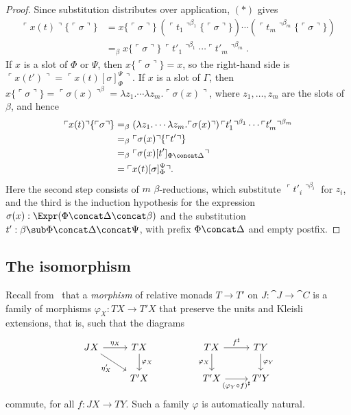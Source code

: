 \begin{proof}
    Since substitution distributes over application, $(*)$ gives
    \begin{align*}    
        \ulcorner x(t) \urcorner\{\ulcorner \sigma \urcorner\} &= x\{\ulcorner \sigma \urcorner\}\, \left(\ulcorner t_1 \urcorner^{\beta_1}\{\ulcorner \sigma \urcorner\}\right) \cdots \left(\ulcorner t_m \urcorner^{\beta_m}\{\ulcorner \sigma \urcorner\}\right)\\
        &=_\beta x\{\ulcorner \sigma \urcorner\}\, \ulcorner t'_1 \urcorner^{\beta_1} \cdots \ulcorner t'_m \urcorner^{\beta_m}.
    \end{align*}
    If $x$ is a slot of $\Phi$ or $\Psi$, then $x\{\ulcorner \sigma \urcorner\} = x$, so the right-hand side is $\ulcorner x(t') \urcorner = \ulcorner x(t)[\sigma]_\Phi^\Psi \urcorner$. If $x$ is a slot of $\Gamma$, then $x\{\ulcorner \sigma \urcorner\} = \ulcorner \sigma(x) \urcorner^\beta = \lambda z_1. \cdots \lambda z_m. \ulcorner \sigma(x) \urcorner$, where $z_1, \ldots, z_m$ are the slots of $\beta$, and hence
    \begin{align*}
        \ulcorner x(t) \urcorner\{\ulcorner \sigma \urcorner\}
        &=_\beta (\lambda z_1. \cdots \lambda z_m. \ulcorner \sigma(x) \urcorner)\, \ulcorner t'_1 \urcorner^{\beta_1} \cdots \ulcorner t'_m \urcorner^{\beta_m}\\
        &=_\beta \ulcorner \sigma(x) \urcorner\{\ulcorner t' \urcorner\}\\
        &=_\beta \ulcorner \sigma(x)[t']_{\Phi \concat \Delta} \urcorner\\
        &= \ulcorner x(t)[\sigma]_\Phi^\Psi \urcorner.
    \end{align*}
    Here the second step consists of $m$ $\beta$-reductions, which substitute $\ulcorner t'_i \urcorner^{\beta_i}$ for $z_i$, and the third is the induction hypothesis for the expression $\sigma(x) : \Expr(\Phi \concat \Delta \concat \beta)$ and the substitution $t' : \beta \sub \Phi \concat \Delta \concat \Psi$, with prefix $\Phi \concat \Delta$ and empty postfix.
\end{proof}

\subsection{The isomorphism}

Recall from~\cite[Def.~2.2]{AltenkirchChapmanUustalu2015} that a \emph{morphism} of relative monads $T \to T'$ on $J : \cat{J} \to \cat{C}$ is a family of morphisms $\varphi_X : TX \to T'X$ that preserve the units and Kleisli extensions, that is, such that the diagrams
\[\begin{tikzcd}
        JX & TX && TX & TY \\
        & {T'X} && {T'X} & {T'Y}
        \arrow["{\eta_X}", from=1-1, to=1-2]
        \arrow["{\eta'_X}"', from=1-1, to=2-2]
        \arrow["{\varphi_X}", from=1-2, to=2-2]
        \arrow["{f^\sharp}", from=1-4, to=1-5]
        \arrow["{\varphi_X}"', from=1-4, to=2-4]
        \arrow["{\varphi_Y}", from=1-5, to=2-5]
        \arrow["{(\varphi_Y \circ f)^\sharp}"', from=2-4, to=2-5]
\end{tikzcd}\]
commute, for all $f : JX \to TY$. Such a family $\varphi$ is automatically natural.

